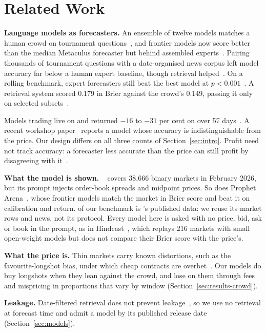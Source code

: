 \section{Related Work}
\label{sec:related}

\textbf{Language models as forecasters.} An ensemble of twelve models matches
a human crowd on tournament questions~\citep{schoenegger2024}, and frontier models now score better than the
median Metaculus forecaster but behind assembled
experts~\citep{lu2025}. Pairing thousands of tournament questions with a
date-organised news corpus left model accuracy far below a human expert
baseline, though retrieval helped~\citep{zou2022}. On a rolling benchmark,
expert forecasters still beat the best model at $p < 0.001$~\citep{karger2025}.
A retrieval system scored 0.179 in Brier against the crowd's 0.149, passing it
only on selected subsets~\citep{halawi2024}.

Models trading live on \polymarket and \kalshi returned $-16$ to $-31$ per cent
on \kalshi over 57 days~\citep{zhang2026arena}.
A recent workshop paper~\citep{henry2026beyond} reports a model whose accuracy
is indistinguishable from the price. Our design differs on all three counts of
Section~\ref{sec:intro}. Profit need not track accuracy: a forecaster less
accurate than the price can still profit by disagreeing with it~\citep{gu2026prophets}.

\textbf{What the model is shown.}
\polybench~\citep{cheng2026polybench} covers 38{,}666 binary \polymarket markets
in February 2026, but its prompt injects order-book spreads and midpoint prices.
So does Prophet Arena~\citep{yang2025prophetarena}, whose frontier models match
the market in Brier score and beat it on calibration and return.
\winA of our benchmark is \polybench's published data: we reuse its market rows
and news, not its protocol. Every model here is asked with no price, bid, ask
or book in the prompt, as in Hindcast~\citep{ye2026hindcast}, which replays 216
\polymarket markets with small open-weight models but does not compare their
Brier score with the price's.

\textbf{What the price is.} Thin markets carry known distortions, such as the
favourite-longshot bias, under which cheap contracts are overbet~\citep{snowberg2010}.
Our models do buy longshots when they lean against the crowd, and lose on them
through fees and mispricing in proportions that vary by window
(Section~\ref{sec:results-crowd}).

\textbf{Leakage.} Date-filtered retrieval does not prevent
leakage~\citep{ellahib2026}, so we use no retrieval at forecast time and admit a
model by its published release date (Section~\ref{sec:models}).

